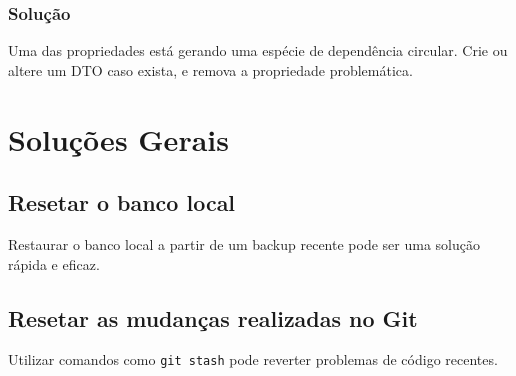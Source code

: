 \documentclass[12pt]{article}
\begin{document}
\subsubsection{Solução}
Uma das propriedades está gerando uma espécie de dependência circular. Crie ou altere um DTO caso exista, e remova a propriedade problemática.

\section{Soluções Gerais}
\subsection{Resetar o banco local}
Restaurar o banco local a partir de um backup recente pode ser uma solução rápida e eficaz.

\subsection{Resetar as mudanças realizadas no Git}
Utilizar comandos como \texttt{git stash} pode reverter problemas de código recentes.
\end{document}
